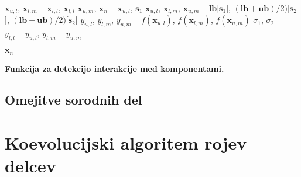 \begin{algorithm}
    

    $\mathbf{x}_{u,l}$, $\mathbf{x}_{l,m}$ \gets~ $\mathbf{x}_{l,l}$, $\mathbf{x}_{l,l}$\;
    $\mathbf{x}_{u,m}$, $\mathbf{x}_n$ \gets~ $\mathbf{x}_{u,l}$, $\mathbf{s}_1$\;
    $\mathbf{x}_{u,l}$, $\mathbf{x}_{l,m}$, $\mathbf{x}_{u,m}$ \gets~ $\mathbf{lb}$[$\mathbf{s}_1$], $(\mathbf{lb} + \mathbf{ub}) / 2)$[$\mathbf{s}_2$], $(\mathbf{lb} + \mathbf{ub}) / 2)$[$\mathbf{s}_2$]\;
    $y_{u,l}$, $y_{l,m}$, $y_{u,m}$ \gets~ $f(\mathbf{x}_{u,l})$, $f(\mathbf{x}_{l,m})$, $f(\mathbf{x}_{u,m})$\;
    $\sigma_1$, $\sigma_2$ \gets~ $y_{l,l} - y_{u,l}$, $y_{l,m} - y_{u,m}$\;


    \Return $\mathbf{x}_n$
 
	\caption{\textbf{Funkcija za detekcijo interakcije med komponentami.}}
	\label{pcode:interact}
\end{algorithm}

\section{Omejitve sorodnih del}


\chapter{Koevolucijski algoritem rojev delcev}\label{chap:algo}


